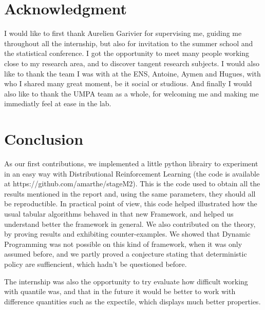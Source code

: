 \documentclass[11pt,a4paper]{article}
\begin{document}

 
\thispagestyle{empty}
\section*{Acknowledgment}
I would like to first thank Aurelien Garivier for supervising me, guiding me throughout all the internship, but also for invitation to the summer school and the statistical conference. I got the opportunity to meet many people working close to my research area, and to discover tangent research subjects. I would also like to thank the team I was with at the ENS, Antoine, Aymen and Hugues, with who I shared many great moment, be it social or studious. And finally I would also like to thank the UMPA team as a whole, for welcoming me and making me immediatly feel at ease in the lab.

\tableofcontents
\newpage

\setcounter{page}{1}

\setlength{\parindent}{16pt}






\section{Conclusion}
As our first contributions, we implemented a little python librairy to experiment in an easy way with Distributional Reinforcement Learning  (the code is available at https://github.com/amarthe/stageM2). This is the code used to obtain all the results mentioned in the report and, using the same parameters, they should all be reproductible. In practical point of view, this code helped illustrated how the usual tabular algorithms behaved in that new Framework, and helped us understand better the framework in general. We also contributed on the theory, by proving results and exhibiting counter-examples. We showed that Dynamic Programming was not possible on this kind of framework, when it was only assumed before, and we partly proved a conjecture stating that deterministic policy are suffiencient, which hadn’t be questioned before.

The internship was also the opportunity to try evaluate how difficult working with quantile was, and that in the future it would be better to work with difference quantities such as the expectile, which displays much better properties.\\
\end{document}
